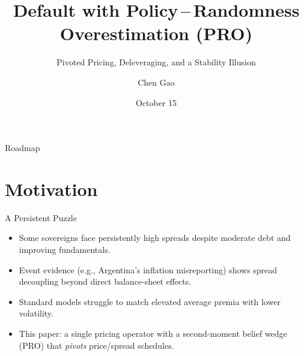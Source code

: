 \documentclass[aspectratio=169,11pt,professionalfonts]{beamer}
\title{Default with Policy\,–\,Randomness Overestimation (PRO)}
\subtitle{Pivoted Pricing, Deleveraging, and a Stability Illusion}
\author{Chen Gao}
\institute{National School of Development, Peking University}
\date{October 15}
\newcommand{\1}{\mathbb{1}}
\begin{document}
\begin{frame}[plain]
  \titlepage
\end{frame}

\begin{frame}{Roadmap}
  \tableofcontents
\end{frame}

\section{Motivation}

\begin{frame}{A Persistent Puzzle}
  \begin{itemize}
    \item Some sovereigns face persistently high spreads despite moderate debt and
          improving fundamentals.
    \item Event evidence (e.g., Argentina’s inflation misreporting) shows spread
          decoupling beyond direct balance-sheet effects.
    \item Standard models struggle to match elevated average premia with lower
          volatility.
    \item This paper: a single pricing operator with a second-moment belief wedge (PRO)
          that \emph{pivots} price/spread schedules.
  \end{itemize}
\end{frame}
\end{document}
